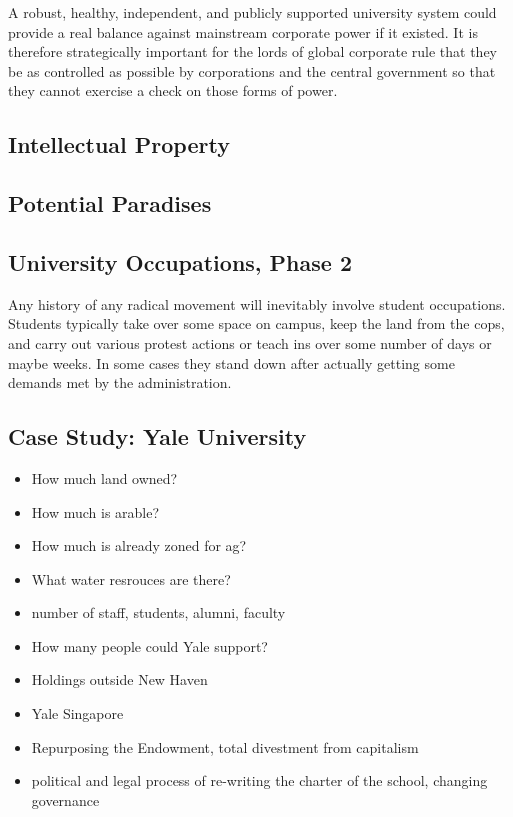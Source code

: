 A robust, healthy, independent, and publicly supported university system
could provide a real balance against mainstream corporate power if it
existed. It is therefore strategically important for the lords of global
corporate rule that they be as controlled as possible by corporations
and the central government so that they cannot exercise a check on those
forms of power.

\subsection{Intellectual Property}\label{intellectual-property}

\subsection{Potential Paradises}\label{potential-paradises}

\subsection{University Occupations, Phase
2}\label{university-occupations-phase-2}

Any history of any radical movement will inevitably involve student
occupations. Students typically take over some space on campus, keep the
land from the cops, and carry out various protest actions or teach ins
over some number of days or maybe weeks. In some cases they stand down
after actually getting some demands met by the administration.

\subsection{Case Study: Yale
University}\label{case-study-yale-university}

\begin{itemize}
\tightlist
\item
  How much land owned?
\item
  How much is arable?
\item
  How much is already zoned for ag?
\item
  What water resrouces are there?
\item
  number of staff, students, alumni, faculty
\item
  How many people could Yale support?
\item
  Holdings outside New Haven
\item
  Yale Singapore
\item
  Repurposing the Endowment, total divestment from capitalism
\item
  political and legal process of re-writing the charter of the school,
  changing governance
\end{itemize}

